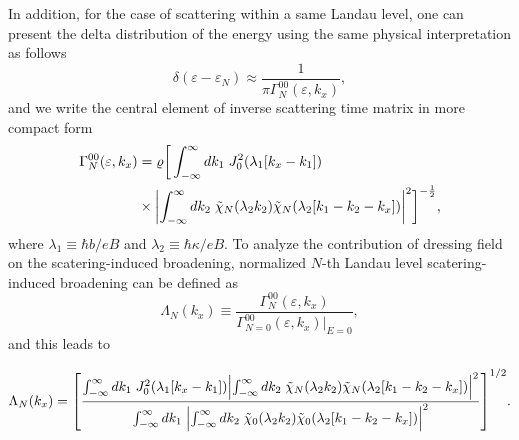 In addition, for the case of scattering within a same Landau level, one can present the delta distribution of the energy using the same physical interpretation \cite{dini16} as follows
\begin{equation} \label{eq_16}
 \delta(\varepsilon - \varepsilon_{N}) \approx
 \frac{1}{\pi \Gamma^{00}_{N}(\varepsilon,k_x)},
\end{equation}
and we write the central element of inverse scattering time matrix in more compact form
\begin{equation} \label{eq_17}
  \begin{aligned}
    \Gamma^{00}_{N}(\varepsilon,k_x)  &=
    \varrho
    \bigg[
    \int_{-\infty}^{\infty} d {k}_1 \;
    J_0^2\qty(\lambda_1[{k}_x - {k}_1]) \\
    & \times
    \qty|
    \int_{-\infty}^{\infty} d{k}_2 \;
    \tilde{\chi}_{N}\qty(\lambda_2 k_2)
    \tilde{\chi}_{N}\qty(\lambda_2 \qty[{k}_1 - {k}_2 - {k}_x])|^2
    \bigg]^{-\frac{1}{2}},
  \end{aligned}
\end{equation}
where $ \lambda_1 \equiv \hbar b/eB$ and  $\lambda_2 \equiv \hbar \kappa/eB$.
To analyze the contribution of dressing field on the scatering-induced broadening, normalized $N$-th Landau level scatering-induced broadening can be defined as
\begin{equation} \label{eq_18}
    \Lambda_N(k_x) \equiv
    \frac{\Gamma^{00}_{N}(\varepsilon,k_x)}{\Gamma^{00}_{N=0}(\varepsilon,k_x)\big|_{E=0}},
\end{equation}
and this leads to
\begin{widetext}
\begin{equation} \label{eq_19}
    \Lambda_N (k_x) =
    \qty[
    \frac
    {\int_{-\infty}^{\infty} d {k}_1 \;
    J_0^2\qty(\lambda_1[{k}_x - {k}_1])
    \qty|
    \int_{-\infty}^{\infty} d{k}_2 \;
    \tilde{\chi}_{N}\qty(\lambda_2 k_2)
    \tilde{\chi}_{N}\qty(\lambda_2 \qty[{k}_1 - {k}_2 - {k}_x])|^2}
    {\int_{-\infty}^{\infty} d {k}_1 \;
    \qty|
    \int_{-\infty}^{\infty} d{k}_2 \;
    \tilde{\chi}_{0}\qty(\lambda_2 k_2)
    \tilde{\chi}_{0}\qty(\lambda_2 \qty[{k}_1 - {k}_2 - {k}_x])|^2}
    ]^{1/2}.
\end{equation}
\end{widetext}

